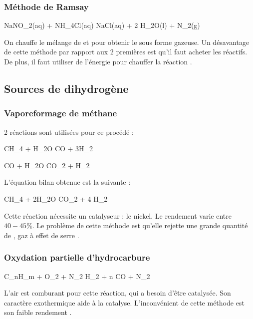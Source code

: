 \documentclass{article}
\begin{document}
	\subsubsection{Méthode de Ramsay}
	
	\begin{chemmath}
			NaNO_2(aq) + NH_4Cl(aq) \longrightarrow NaCl(aq) + 2 H_2O(l) + N_2(g)
	\end{chemmath}
	
	On chauffe le mélange de  et  pour obtenir le  sous forme gazeuse.
	Un désavantage de cette méthode par rapport aux 2 premières est qu'il faut acheter les réactifs. De plus, il faut utiliser de l'énergie pour chauffer la réaction \cite{wiki-n2}.

	\subsection{Sources de dihydrogène}
		\subsubsection{Vaporeformage de méthane}
		2 réactions sont utilisées pour ce procédé \cite{afhypac} :
		
		\begin{chemmath} 
			CH_4 + H_2O \longleftrightarrow CO + 3H_2
		\end{chemmath}
		
		\begin{chemmath}
			CO + H_2O \longleftrightarrow CO_2 + H_2
		\end{chemmath}
		
		L'équation bilan obtenue est la suivante :
		
		\begin{chemmath}
			CH_4 + 2H_2O \longleftrightarrow CO_2 + 4 H_2
		\end{chemmath}
		
			Cette réaction nécessite un catalyseur : le nickel. Le rendement varie entre $40-45\%$. Le problème de cette 
			méthode est qu'elle rejette une grande quantité de , gaz à effet de serre \cite{wiki-h2}.
			
		\subsubsection{Oxydation partielle d'hydrocarbure}
		\begin{chemmath}
			C_nH_m +  O_2 +  N_2 \longrightarrow {} H_2 + n CO + \frac{3,76n}{2} N_2
		\end{chemmath}
		L'air est comburant pour cette réaction, qui a besoin d'être catalysée. Son caractère exothermique aide à la catalyse. 
		L'inconvénient de cette méthode est son faible rendement \cite{wiki-h2}.
\end{document}
